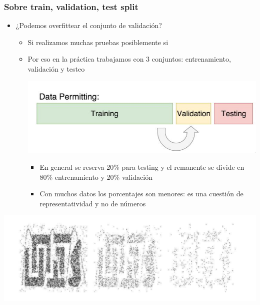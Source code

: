 \documentclass[leqno, 10pt, envcountsect]{beamer}
\numberwithin{equation}{section}
\theoremstyle{definition}
\theoremstyle{example}
\numberwithin{figure}{section}
\numberwithin{table}{section}
\let\olditem\item
\renewcommand{\item}{%
\olditem\vspace{1pt}}
\begin{document}
\begin{frame}
  \frametitle{Sobre train, validation, test split}
  \begin{itemize}
    \item ¿Podemos overfittear el conjunto de validación?
      \begin{itemize}
        \item Si realizamos muchas pruebas posiblemente si
        \item Por eso en la práctica trabajamos con 3 conjuntos:
          entrenamiento, validación y testeo
        \begin{center}
          \includegraphics[scale=0.3]{tvt.png}
        \end{center}
        \begin{itemize}
          \item En general se reserva 20\% para testing y el remanente se
            divide en 80\% entrenamiento y 20\% validación
          \item Con muchos datos los porcentajes son menores: es una cuestión
            de representatividad y no de números
          \nocite{james13}\nocite{efron16}
        \end{itemize}
      \end{itemize}
  \end{itemize}
  \begin{center}
    \includegraphics[scale=0.32]{sample_size.png}
  \end{center}
\end{frame}
\end{document}
